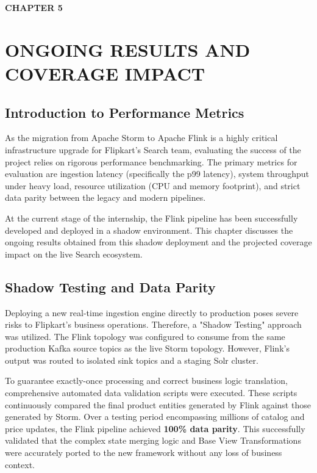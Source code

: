 \newpage
\textbf{\huge CHAPTER  5}\\
\section{ONGOING RESULTS AND COVERAGE IMPACT} \setcounter{section}{5}
\subsection{Introduction to Performance Metrics}\setcounter{subsection}{1}
\begin{justify}
    As the migration from Apache Storm to Apache Flink is a highly critical infrastructure upgrade for Flipkart's Search team, evaluating the success of the project relies on rigorous performance benchmarking. The primary metrics for evaluation are ingestion latency (specifically the p99 latency), system throughput under heavy load, resource utilization (CPU and memory footprint), and strict data parity between the legacy and modern pipelines. 

    At the current stage of the internship, the Flink pipeline has been successfully developed and deployed in a shadow environment. This chapter discusses the ongoing results obtained from this shadow deployment and the projected coverage impact on the live Search ecosystem.
\end{justify}

\vspace{0.25cm}

\subsection{Shadow Testing and Data Parity}
\begin{justify}
    Deploying a new real-time ingestion engine directly to production poses severe risks to Flipkart's business operations. Therefore, a "Shadow Testing" approach was utilized. The Flink topology was configured to consume from the same production Kafka source topics as the live Storm topology. However, Flink's output was routed to isolated sink topics and a staging Solr cluster.
    
    To guarantee exactly-once processing and correct business logic translation, comprehensive automated data validation scripts were executed. These scripts continuously compared the final product entities generated by Flink against those generated by Storm. Over a testing period encompassing millions of catalog and price updates, the Flink pipeline achieved \textbf{100\% data parity}. This successfully validated that the complex state merging logic and Base View Transformations were accurately ported to the new framework without any loss of business context.
\end{justify}

